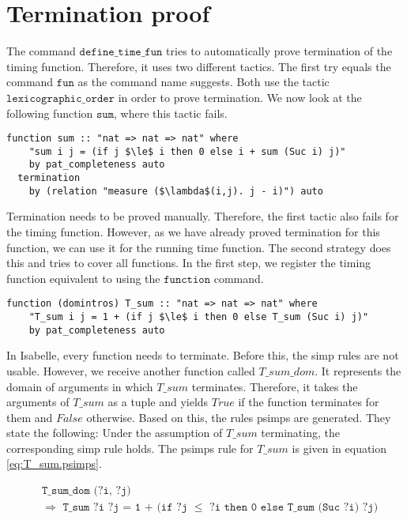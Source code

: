 

\section{Termination proof} \label{chapter:termination}

The command $\texttt{define\_time\_fun}$ tries to automatically prove termination of the timing function.
Therefore, it uses two different tactics.
The first try equals the command $\texttt{fun}$ as the command name suggests.
Both use the tactic $\texttt{lexicographic\_order}$ in order to prove termination.
We now look at the following function $\texttt{sum}$, where this tactic fails.
\begin{lstlisting}[language=isabelle,mathescape=true]
  function sum :: "nat => nat => nat" where
    "sum i j = (if j $\le$ i then 0 else i + sum (Suc i) j)"
    by pat_completeness auto
  termination
    by (relation "measure ($\lambda$(i,j). j - i)") auto
\end{lstlisting}

Termination needs to be proved manually.
Therefore, the first tactic also fails for the timing function.
However, as we have already proved termination for this function, we can use it for the running time function.
The second strategy does this and tries to cover all functions.
In the first step, we register the timing function equivalent to using the $\texttt{function}$ command.
\begin{lstlisting}[language=isabelle,mathescape=true,caption=Function registration,label=lst:sum_reg]
  function (domintros) T_sum :: "nat => nat => nat" where
    "T_sum i j = 1 + (if j $\le$ i then 0 else T_sum (Suc i) j)"
    by pat_completeness auto
\end{lstlisting}
In Isabelle, every function needs to terminate.
Before this, the simp rules are not usable.
However, we receive another function called $T\_sum\_dom$.
It represents the domain of arguments in which $T\_sum$ terminates.
Therefore, it takes the arguments of $T\_sum$ as a tuple and yields $True$ if the function terminates for them and $False$ otherwise.
Based on this, the rules psimps are generated.
They state the following: Under the assumption of $T\_sum$ terminating, the corresponding simp rule holds.
The psimps rule for $T\_sum$ is given in equation \ref{eq:T_sum.psimps}.

\begin{equation}
  \begin{aligned}
  &\texttt{T\_sum\_dom (?i, ?j)}\\
  &\texttt{$\Longrightarrow$ T\_sum ?i ?j = 1 + (if ?j $\le$ ?i then 0 else T\_sum (Suc ?i) ?j)}
  \end{aligned}
  \label{eq:T_sum.psimps}
\end{equation}


